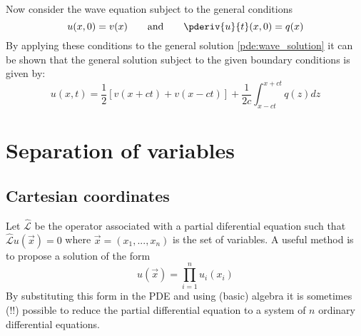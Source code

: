     Now consider the wave equation subject to the general conditions
    \begin{equation}
		u(x, 0) = v(x)\qquad\text{and}\qquad \pderiv{u}{t}(x, 0) = q(x)
	\end{equation}
    By applying these conditions to the general solution \ref{pde:wave_solution} it can be shown that the general solution subject to the given boundary conditions is given by:
    \begin{equation}
		\label{pde:dalembert_solution}
        \boxed {u(x, t) = \frac{1}{2}\left[v(x+ct) + v(x-ct)\right] + \frac{1}{2c}\int_{x-ct}^{x+ct}q(z)dz}
	\end{equation}
    

\section{Separation of variables}

\subsection{Cartesian coordinates}
	\begin{method}
		Let $\hat{\mathcal{L}}$ be the operator associated with a partial diferential equation such that $\hat{\mathcal{L}}u(\vec{x}) = 0$ where $\vec{x} = (x_1,...,x_n)$ is the set of variables. A useful method is to propose a solution of the form
        \[
        	u(\vec{x}) = \prod_{i=1}^nu_i(x_i)
        \]
        By substituting this form in the PDE and using (basic) algebra it is sometimes (!!) possible to reduce the partial differential equation to a system of $n$ ordinary differential equations.
	\end{method}
    
